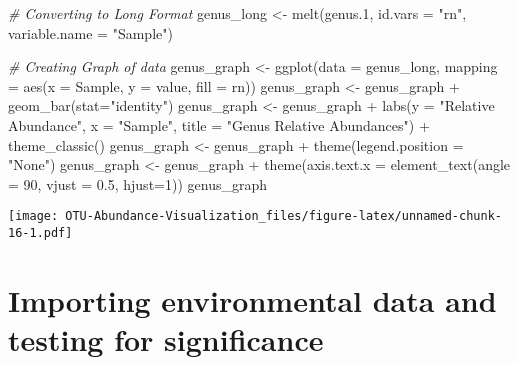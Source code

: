 \documentclass[
]{article}
\newenvironment{Shaded}{\begin{snugshade}}{\end{snugshade}}
\newcommand{\AttributeTok}[1]{\textcolor[rgb]{0.77,0.63,0.00}{#1}}
\newcommand{\CommentTok}[1]{\textcolor[rgb]{0.56,0.35,0.01}{\textit{#1}}}
\newcommand{\DecValTok}[1]{\textcolor[rgb]{0.00,0.00,0.81}{#1}}
\newcommand{\FloatTok}[1]{\textcolor[rgb]{0.00,0.00,0.81}{#1}}
\newcommand{\FunctionTok}[1]{\textcolor[rgb]{0.00,0.00,0.00}{#1}}
\newcommand{\NormalTok}[1]{#1}
\newcommand{\OtherTok}[1]{\textcolor[rgb]{0.56,0.35,0.01}{#1}}
\newcommand{\SpecialCharTok}[1]{\textcolor[rgb]{0.00,0.00,0.00}{#1}}
\newcommand{\StringTok}[1]{\textcolor[rgb]{0.31,0.60,0.02}{#1}}
\begin{document}
\begin{Shaded}
\begin{Highlighting}[]
\CommentTok{\# Converting to Long Format}
\NormalTok{genus\_long }\OtherTok{\textless{}{-}} \FunctionTok{melt}\NormalTok{(genus}\FloatTok{.1}\NormalTok{, }\AttributeTok{id.vars =} \StringTok{"rn"}\NormalTok{, }\AttributeTok{variable.name =} \StringTok{"Sample"}\NormalTok{)}

\CommentTok{\# Creating Graph of data}
\NormalTok{genus\_graph }\OtherTok{\textless{}{-}} \FunctionTok{ggplot}\NormalTok{(}\AttributeTok{data =}\NormalTok{ genus\_long, }\AttributeTok{mapping =} \FunctionTok{aes}\NormalTok{(}\AttributeTok{x =}\NormalTok{ Sample,  }\AttributeTok{y =}\NormalTok{ value, }\AttributeTok{fill =}\NormalTok{ rn))}
\NormalTok{genus\_graph }\OtherTok{\textless{}{-}}\NormalTok{ genus\_graph }\SpecialCharTok{+} \FunctionTok{geom\_bar}\NormalTok{(}\AttributeTok{stat=}\StringTok{"identity"}\NormalTok{)}
\NormalTok{genus\_graph }\OtherTok{\textless{}{-}}\NormalTok{ genus\_graph }\SpecialCharTok{+} \FunctionTok{labs}\NormalTok{(}\AttributeTok{y =} \StringTok{"Relative Abundance"}\NormalTok{, }\AttributeTok{x =} \StringTok{"Sample"}\NormalTok{, }\AttributeTok{title =} \StringTok{"Genus Relative Abundances"}\NormalTok{) }\SpecialCharTok{+} \FunctionTok{theme\_classic}\NormalTok{()}
\NormalTok{genus\_graph }\OtherTok{\textless{}{-}}\NormalTok{ genus\_graph }\SpecialCharTok{+} \FunctionTok{theme}\NormalTok{(}\AttributeTok{legend.position =} \StringTok{"None"}\NormalTok{)}
\NormalTok{genus\_graph }\OtherTok{\textless{}{-}}\NormalTok{ genus\_graph }\SpecialCharTok{+} \FunctionTok{theme}\NormalTok{(}\AttributeTok{axis.text.x =} \FunctionTok{element\_text}\NormalTok{(}\AttributeTok{angle =} \DecValTok{90}\NormalTok{, }\AttributeTok{vjust =} \FloatTok{0.5}\NormalTok{, }\AttributeTok{hjust=}\DecValTok{1}\NormalTok{))}
\NormalTok{genus\_graph}
\end{Highlighting}
\end{Shaded}

\texttt{[image: OTU-Abundance-Visualization\_files/figure-latex/unnamed-chunk-16-1.pdf]}

\hypertarget{importing-environmental-data-and-testing-for-significance}{%
\section{Importing environmental data and testing for
significance}\label{importing-environmental-data-and-testing-for-significance}}
\end{document}
